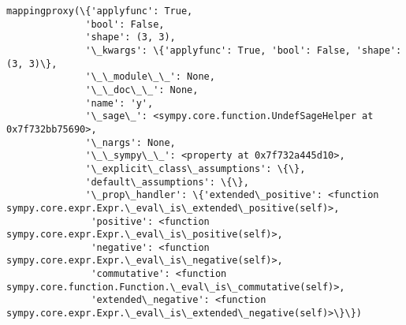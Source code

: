 \documentclass[11pt]{article}
\makeatletter
\newcommand{\boxspacing}{\kern\kvtcb@left@rule\kern\kvtcb@boxsep}
\newcommand{\prompt}[4]{
        \ttfamily\llap{{\color{#2}[#3]:\hspace{3pt}#4}}\vspace{-\baselineskip}
    }
\makeatother
\begin{document}
            \begin{tcolorbox}[breakable, size=fbox, boxrule=.5pt, pad at break*=1mm, opacityfill=0]
\prompt{Out}{outcolor}{145}{\boxspacing}
\begin{Verbatim}[commandchars=\\\{\}]
mappingproxy(\{'applyfunc': True,
              'bool': False,
              'shape': (3, 3),
              '\_kwargs': \{'applyfunc': True, 'bool': False, 'shape': (3, 3)\},
              '\_\_module\_\_': None,
              '\_\_doc\_\_': None,
              'name': 'y',
              '\_sage\_': <sympy.core.function.UndefSageHelper at 0x7f732bb75690>,
              '\_nargs': None,
              '\_\_sympy\_\_': <property at 0x7f732a445d10>,
              '\_explicit\_class\_assumptions': \{\},
              'default\_assumptions': \{\},
              '\_prop\_handler': \{'extended\_positive': <function
sympy.core.expr.Expr.\_eval\_is\_extended\_positive(self)>,
               'positive': <function
sympy.core.expr.Expr.\_eval\_is\_positive(self)>,
               'negative': <function
sympy.core.expr.Expr.\_eval\_is\_negative(self)>,
               'commutative': <function
sympy.core.function.Function.\_eval\_is\_commutative(self)>,
               'extended\_negative': <function
sympy.core.expr.Expr.\_eval\_is\_extended\_negative(self)>\}\})
\end{Verbatim}
\end{tcolorbox}
        
    \begin{tcolorbox}[breakable, size=fbox, boxrule=1pt, pad at break*=1mm,colback=cellbackground, colframe=cellborder]
\prompt{In}{incolor}{146}{\boxspacing}
\begin{Verbatim}[commandchars=\\\{\}]
\end{Verbatim}
\end{tcolorbox}

    \begin{tcolorbox}[breakable, size=fbox, boxrule=1pt, pad at break*=1mm,colback=cellbackground, colframe=cellborder]
\prompt{In}{incolor}{146}{\boxspacing}
\begin{Verbatim}[commandchars=\\\{\}]
\end{Verbatim}
\end{tcolorbox}
\end{document}
